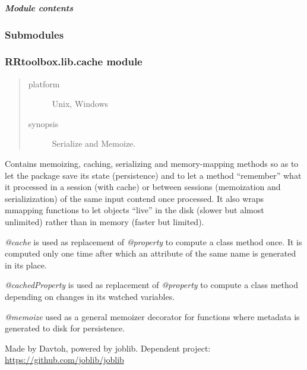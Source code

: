 \documentclass[letterpaper,10pt,english]{sphinxmanual}
\begin{document}
\subparagraph{Module contents}
\label{RRtoolbox.lib.arrayops:module-RRtoolbox.lib.arrayops}\label{RRtoolbox.lib.arrayops:module-contents}

\subsubsection{Submodules}
\label{RRtoolbox.lib:submodules}

\subsubsection{RRtoolbox.lib.cache module}
\label{RRtoolbox.lib:rrtoolbox-lib-cache-module}\label{RRtoolbox.lib:module-RRtoolbox.lib.cache}\begin{quote}\begin{description}
\item[{platform}] \leavevmode
Unix, Windows

\item[{synopsis}] \leavevmode
Serialize and Memoize.

\end{description}\end{quote}

Contains memoizing, caching, serializing and memory-mapping methods so as to let the package
save its state (persistence) and to let a method ``remember'' what it processed in a session (with cache) or
between sessions (memoization and serializization) of the same input contend once processed. It also wraps mmapping
functions to let objects ``live'' in the disk (slower but almost unlimited) rather than in memory (faster but limited).

\emph{@cache} is used as replacement of \emph{@property} to compute a class method once.
It is computed only one time after which an attribute of the same name is generated in its place.

\emph{@cachedProperty} is used as replacement of \emph{@property} to compute
a class method depending on changes in its watched variables.

\emph{@memoize} used as a general memoizer decorator for functions
where metadata is generated to disk for persistence.

Made by Davtoh, powered by joblib.
Dependent project: \href{https://github.com/joblib/joblib}{https://github.com/joblib/joblib}
\end{document}
